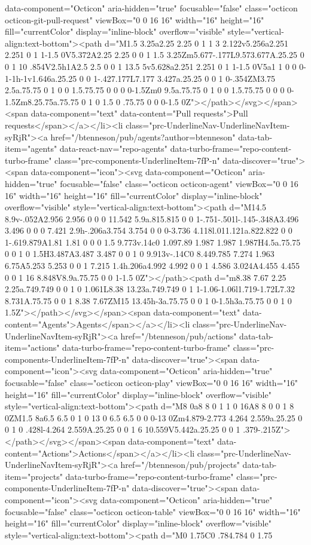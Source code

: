 {{{data-component="Octicon" aria-hidden="true" focusable="false" class="octicon octicon-git-pull-request" viewBox="0 0 16 16" width="16" height="16" fill="currentColor" display="inline-block" overflow="visible" style="vertical-align:text-bottom"><path d="M1.5 3.25a2.25 2.25 0 1 1 3 2.122v5.256a2.251 2.251 0 1 1-1.5 0V5.372A2.25 2.25 0 0 1 1.5 3.25Zm5.677-.177L9.573.677A.25.25 0 0 1 10 .854V2.5h1A2.5 2.5 0 0 1 13.5 5v5.628a2.251 2.251 0 1 1-1.5 0V5a1 1 0 0 0-1-1h-1v1.646a.25.25 0 0 1-.427.177L7.177 3.427a.25.25 0 0 1 0-.354ZM3.75 2.5a.75.75 0 1 0 0 1.5.75.75 0 0 0 0-1.5Zm0 9.5a.75.75 0 1 0 0 1.5.75.75 0 0 0 0-1.5Zm8.25.75a.75.75 0 1 0 1.5 0 .75.75 0 0 0-1.5 0Z"></path></svg></span><span data-component="text" data-content="Pull requests">Pull requests</span></a></li><li class="prc-UnderlineNav-UnderlineNavItem-syRjR"><a href="/btenneson/pub/agents?author=btenneson" data-tab-item="agents" data-react-nav="repo-agents" data-turbo-frame="repo-content-turbo-frame" class="prc-components-UnderlineItem-7fP-n" data-discover="true"><span data-component="icon"><svg data-component="Octicon" aria-hidden="true" focusable="false" class="octicon octicon-agent" viewBox="0 0 16 16" width="16" height="16" fill="currentColor" display="inline-block" overflow="visible" style="vertical-align:text-bottom"><path d="M14.5 8.9v-.052A2.956 2.956 0 0 0 11.542 5.9a.815.815 0 0 1-.751-.501l-.145-.348A3.496 3.496 0 0 0 7.421 2.9h-.206a3.754 3.754 0 0 0-3.736 4.118l.011.121a.822.822 0 0 1-.619.879A1.81 1.81 0 0 0 1.5 9.773v.14c0 1.097.89 1.987 1.987 1.987H4.5a.75.75 0 0 1 0 1.5H3.487A3.487 3.487 0 0 1 0 9.913v-.14C0 8.449.785 7.274 1.963 6.75A5.253 5.253 0 0 1 7.215 1.4h.206a4.992 4.992 0 0 1 4.586 3.024A4.455 4.455 0 0 1 16 8.848V8.9a.75.75 0 0 1-1.5 0Z"></path><path d="m8.38 7.67 2.25 2.25a.749.749 0 0 1 0 1.061L8.38 13.23a.749.749 0 1 1-1.06-1.06l1.719-1.72L7.32 8.731A.75.75 0 0 1 8.38 7.67ZM15 13.45h-3a.75.75 0 0 1 0-1.5h3a.75.75 0 0 1 0 1.5Z"></path></svg></span><span data-component="text" data-content="Agents">Agents</span></a></li><li class="prc-UnderlineNav-UnderlineNavItem-syRjR"><a href="/btenneson/pub/actions" data-tab-item="actions" data-turbo-frame="repo-content-turbo-frame" class="prc-components-UnderlineItem-7fP-n" data-discover="true"><span data-component="icon"><svg data-component="Octicon" aria-hidden="true" focusable="false" class="octicon octicon-play" viewBox="0 0 16 16" width="16" height="16" fill="currentColor" display="inline-block" overflow="visible" style="vertical-align:text-bottom"><path d="M8 0a8 8 0 1 1 0 16A8 8 0 0 1 8 0ZM1.5 8a6.5 6.5 0 1 0 13 0 6.5 6.5 0 0 0-13 0Zm4.879-2.773 4.264 2.559a.25.25 0 0 1 0 .428l-4.264 2.559A.25.25 0 0 1 6 10.559V5.442a.25.25 0 0 1 .379-.215Z"></path></svg></span><span data-component="text" data-content="Actions">Actions</span></a></li><li class="prc-UnderlineNav-UnderlineNavItem-syRjR"><a href="/btenneson/pub/projects" data-tab-item="projects" data-turbo-frame="repo-content-turbo-frame" class="prc-components-UnderlineItem-7fP-n" data-discover="true"><span data-component="icon"><svg data-component="Octicon" aria-hidden="true" focusable="false" class="octicon octicon-table" viewBox="0 0 16 16" width="16" height="16" fill="currentColor" display="inline-block" overflow="visible" style="vertical-align:text-bottom"><path d="M0 1.75C0 .784.784 0 1.75 }}}
